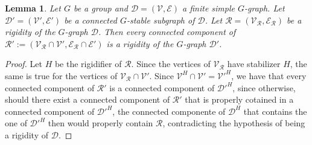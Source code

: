 \documentclass[a4paper,12pt,reqno]{amsart}
\newtheorem{lem}[thm]{Lemma}
\theoremstyle{definition}
\numberwithin{equation}{thm}
\begin{document}
\begin{lem}\label{restricting rigidities}
   Let $G$ be a group and $\mathcal{D}=(\mathcal{V},\mathcal{E})$ a finite simple $G$-graph. Let $\mathcal{D}'=(\mathcal{V}',\mathcal{E}')$ be a connected $G$-stable subgraph of $\mathcal{D}$. Let $\mathcal{R}=(\mathcal{V}_\mathcal{R},\mathcal{E}_\mathcal{R})$ be a rigidity of the $G$-graph $\mathcal{D}$. Then every connected component of $\mathcal{R}':=(\mathcal{V}_{\mathcal{R}} \cap \mathcal{V}' ,  \mathcal{E}_\mathcal{R}\cap \mathcal{E}')$ is a rigidity of the $G$-graph $\mathcal{D}'$.
\end{lem}
\begin{proof}
  Let $H$ be the rigidifier of $\mathcal{R}$. Since the vertices of $\mathcal{V}_{\mathcal{R}}$ have stabilizer $H$, the same is true for the vertices of $\mathcal{V}_{\mathcal{R}} \cap \mathcal{V}'$. Since $\mathcal{V}^H\cap \mathcal{V}'= \mathcal{V}'^H$, we have that every connected component of $\mathcal{R}'$ is a connected component of $\mathcal{D}'^H$, since otherwise, should there exist a connected component of $\mathcal{R}'$ that is properly cotained in a connected component of $\mathcal{D}'^H$, the connected componente of $\mathcal{D}^H$ that contains the one of  $\mathcal{D}'^H$ then would properly contain $\mathcal{R}$, contradicting the hypothesis of being a rigidity of $\mathcal{D}$.
\end{proof}

\smallskip
\end{document}
